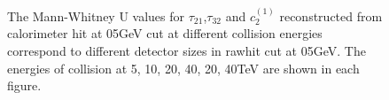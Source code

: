 \documentclass[final,1p,11pt]{elsarticle}
\begin{document}




\begin{figure}
\begin{center}
\end{center}
\caption{The Mann-Whitney U values for $\tau_{21}$,$\tau_{32}$ and $c_2^{(1)}$ reconstructed from calorimeter hit at 05GeV cut at different collision energies correspond to different detector sizes in rawhit cut at 05GeV. The energies of collision at 5, 10, 20, 40, 20, 40TeV are shown in each figure.}
\label{fig:raw_U_summary}
\end{figure}
\end{document}
